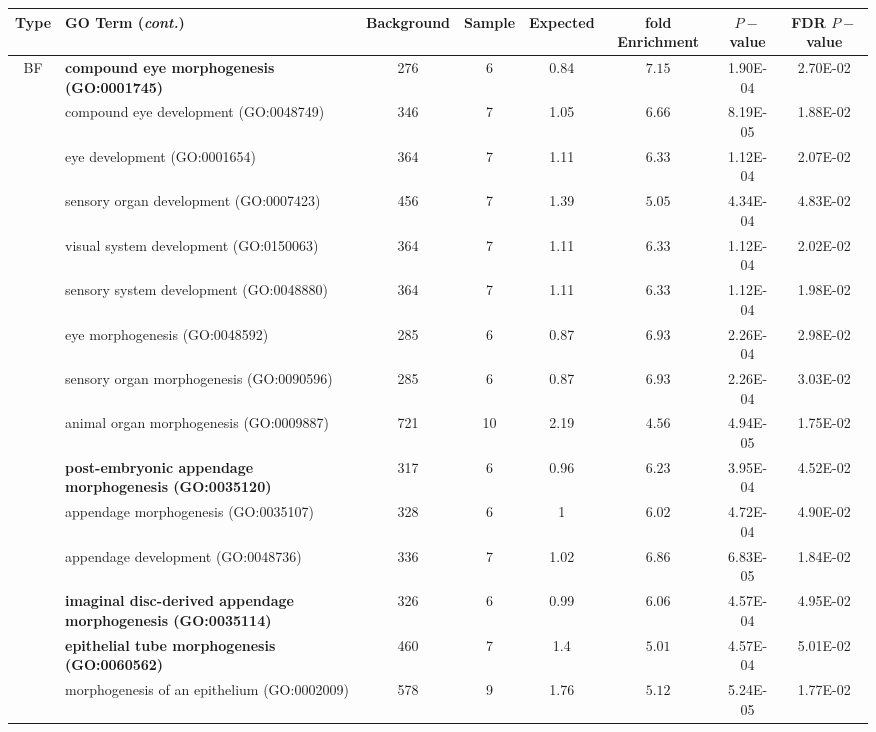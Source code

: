  \begin{table}[!b]
\renewcommand{\arraystretch}{1.2}
\begin{center}
\small
\tiny
\begin{tabular}{clS[table-format=4.0]S[table-format=2.0]S[table-format=2.2]ccc}
\toprule
\textbf{Type} &\textbf{GO Term (\textit{cont.})} &\textbf{Background} &\textbf{Sample} &\textbf{Expected} &\textbf{fold Enrichment} &\textbf{$P-$value} &\textbf{FDR $P-$value}\\
\midrule
 BF & \textbf{compound eye morphogenesis (GO:0001745)} & 276 & 6 & 0.84 & $7.15$ & 1.90E-04 & 2.70E-02 \\
 & compound eye development (GO:0048749) & 346 & 7 & 1.05 & $6.66$ & 8.19E-05 & 1.88E-02 \\
 & eye development (GO:0001654) & 364 & 7 & 1.11 & $6.33$ & 1.12E-04 & 2.07E-02 \\
 & sensory organ development (GO:0007423) & 456 & 7 & 1.39 & $5.05$ & 4.34E-04 & 4.83E-02 \\
 & visual system development (GO:0150063) & 364 & 7 & 1.11 & $6.33$ & 1.12E-04 & 2.02E-02 \\
 & sensory system development (GO:0048880) & 364 & 7 & 1.11 & $6.33$ & 1.12E-04 & 1.98E-02 \\
 & eye morphogenesis (GO:0048592) & 285 & 6 & 0.87 & $6.93$ & 2.26E-04 & 2.98E-02 \\
 & sensory organ morphogenesis (GO:0090596) & 285 & 6 & 0.87 & $6.93$ & 2.26E-04 & 3.03E-02 \\
 & animal organ morphogenesis (GO:0009887) & 721 & 10 & 2.19 & $4.56$ & 4.94E-05 & 1.75E-02 \\[1.5ex]
 & \textbf{post-embryonic appendage morphogenesis (GO:0035120)} & 317 & 6 & 0.96 & $6.23$ & 3.95E-04 & 4.52E-02 \\
 & appendage morphogenesis (GO:0035107) & 328 & 6 & 1 & $6.02$ & 4.72E-04 & 4.90E-02 \\
 & appendage development (GO:0048736) & 336 & 7 & 1.02 & $6.86$ & 6.83E-05 & 1.84E-02 \\[1.5ex]
 & \textbf{imaginal disc-derived appendage morphogenesis (GO:0035114)} & 326 & 6 & 0.99 & $6.06$ & 4.57E-04 & 4.95E-02 \\[1.5ex]
 & \textbf{epithelial tube morphogenesis (GO:0060562)} & 460 & 7 & 1.4 & $5.01$ & 4.57E-04 & 5.01E-02 \\
 & morphogenesis of an epithelium (GO:0002009) & 578 & 9 & 1.76 & $5.12$ & 5.24E-05 & 1.77E-02 \\

\end{tabular}
\end{center}
\end{table}
